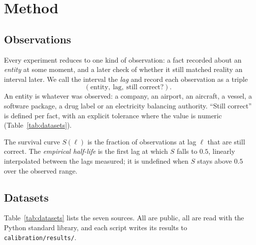 
\section{Method}\label{sec:method}

\subsection{Observations}

Every experiment reduces to one kind of observation: a fact recorded about
an \emph{entity} at some moment, and a later check of whether it still
matched reality an interval later. We call the interval the \emph{lag} and
record each observation as a triple
\[
  (\text{entity},\ \text{lag},\ \text{still correct?}).
\]
An entity is whatever was observed: a company, an airport, an aircraft, a
vessel, a software package, a drug label or an electricity balancing
authority. ``Still correct'' is defined per fact, with an explicit
tolerance where the value is numeric (Table~\ref{tab:datasets}).

The survival curve $S(\ell)$ is the fraction of observations at lag $\ell$
that are still correct. The \emph{empirical half-life} is the first lag at
which $S$ falls to $0.5$, linearly interpolated between the lags measured;
it is undefined when $S$ stays above $0.5$ over the observed range.

\subsection{Datasets}

Table~\ref{tab:datasets} lists the seven sources. All are public, all are
read with the Python standard library, and each script writes its results
to \texttt{calibration/results/}.

